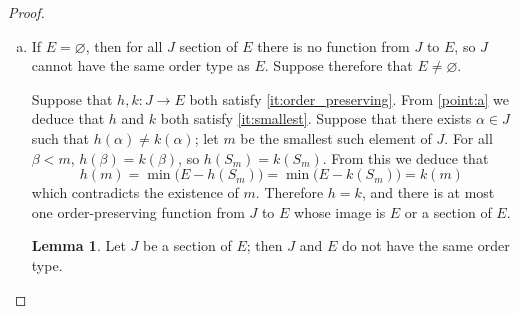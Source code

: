 \documentclass[11pt,a4paper,twoside]{article}
\theoremstyle{definition}
\newtheorem{lemma}{Lemma}
\begin{document}
\begin{proof}
\begin{enumerate}[(a)]
\begin{description}
\begin{itemize}
      \item If $\beta$ does not have an immediate predecessor, then $S_\beta = \cup_{\alpha < \beta} \,S_\alpha$. Since $S_\beta \subset J_0$,
        we have $\alpha \in J_0$ for all $\alpha < \beta$, and
        \begin{equation*}
          h ( S_\beta ) = h \left( \bigcup_{\alpha < \beta} \,S_\alpha \right) = \bigcup_{\alpha < \beta} \,h ( S_\alpha ) = \mathscr{S}
        \end{equation*}

        From \cref{lemma:union_of_sections}, we deduce that $\mathscr{S}$ is either $E$ or a section of $E$. And since
        $h ( \beta ) \in E - h ( S_\beta )$ exists for all $\beta \in J$, $\mathscr{S} = S_m$ for some $m \in E$. The element $m$ is the smallest
        upper bound for $h ( S_\beta )$ in $E$, and therefore $m = h ( \beta )$, and $\beta \in J_0$.

      \end{itemize}
      From the above, we deduce that $J_0$ is an inductive subset of $J$, and therefore $J_0 = J$.

    \end{description}

  \item If $E = \varnothing$, then for all $J$ section of $E$ there is no function from $J$ to $E$, so $J$ cannot have the
    same order type as $E$. Suppose therefore that $E \neq \varnothing$.

    Suppose that $h, k : J \to E$ both satisfy \ref{it:order_preserving}. From \ref{point:a} we deduce that $h$ and $k$ both satisfy \ref{it:smallest}.
    Suppose that there exists $\alpha \in J$ such that $h ( \alpha ) \neq k ( \alpha )$; let $m$ be the smallest such element of $J$.
    For all $\beta < m$, $h ( \beta ) = k ( \beta )$, so $h ( S_m ) = k ( S_m )$. From this we deduce that
    \begin{equation*}
      h ( m ) = \min \big( E - h ( S_m ) \big) = \min \big( E - k ( S_m ) \big) = k ( m )
    \end{equation*}
    which contradicts the existence of $m$. Therefore $h = k$, and there is at most one order-preserving function from $J$ to $E$
    whose image is $E$ or a section of $E$.

    \bigskip
    \begin{lemma}\label{lemma:section_order_type}
      Let $J$ be a section of $E$; then $J$ and $E$ do not have the same order type.
    \end{lemma}


\end{enumerate}
\end{proof}
\end{document}
